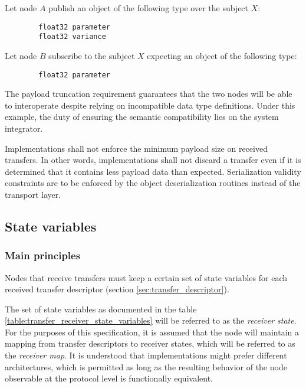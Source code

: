 \begin{remark}
    Let node $A$ publish an object of the following type over the subject $X$:

    \begin{verbatim}
        float32 parameter
        float32 variance
    \end{verbatim}

    Let node $B$ subscribe to the subject $X$ expecting an object of the following type:

    \begin{verbatim}
        float32 parameter
    \end{verbatim}

    The payload truncation requirement guarantees that the two nodes will be able to interoperate despite
    relying on incompatible data type definitions.
    Under this example, the duty of ensuring the semantic compatibility lies on the system integrator.
\end{remark}

Implementations shall not enforce the minimum payload size on received transfers.
In other words, implementations shall not discard a transfer even if it is determined that it contains less payload
data than expected.
Serialization validity constraints are to be enforced by the object deserialization routines
instead of the transport layer.

\subsection{State variables}

\subsubsection{Main principles}

Nodes that receive transfers must keep a certain set of state variables for each
received transfer descriptor (section \ref{sec:transfer_descriptor}).

The set of state variables as documented in the table \ref{table:transfer_receiver_state_variables}
will be referred to as the \emph{receiver state}.
For the purposes of this specification, it is assumed that the node will maintain a
mapping from transfer descriptors to receiver states, which will be referred to as the \emph{receiver map}.
It is understood that implementations might prefer different architectures, which is permitted as
long as the resulting behavior of the node observable at the protocol level is functionally equivalent.

